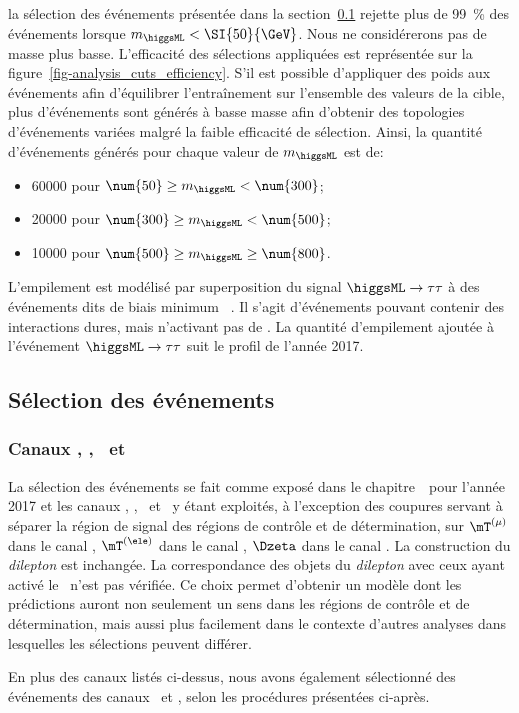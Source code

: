 la sélection des événements présentée dans la section~\ref{chapter-ML-section-evt_gen-selection} rejette plus de \SI{99}{\%} des événements lorsque $m_{\higgsML} < \SI{50}{\GeV}$.
Nous ne considérerons pas de masse plus basse.
L'efficacité des sélections appliquées est représentée sur la figure~\ref{fig-analysis_cuts_efficiency}.
S'il est possible d'appliquer des poids aux événements afin d'équilibrer l'entraînement sur l'ensemble des valeurs de la cible,
plus d'événements sont générés à basse masse afin d'obtenir des topologies d'événements variées malgré la faible efficacité de sélection.
Ainsi, la quantité d'événements générés pour chaque valeur de $m_{\higgsML}$ est de:
\begin{itemize}
\item \num{60000} pour $ \num{50} \geq m_{\higgsML} < \num{300} $;
\item \num{20000} pour $ \num{300} \geq m_{\higgsML} < \num{500} $;
\item \num{10000} pour $ \num{500} \geq m_{\higgsML} \geq \num{800}$.
\end{itemize}
\par
L'empilement est modélisé par superposition du signal $\higgsML\to\tau\tau$ à des événements dits de \og biais minimum \fg~\cite{pythia8.2}.
Il s'agit d'événements pouvant contenir des interactions dures, mais n'activant pas de \HLTpath.
La quantité d'empilement ajoutée à l'événement $\higgsML\to\tau\tau$ suit le profil de l'année 2017.
\subsection{Sélection des événements}\label{chapter-ML-section-evt_gen-selection}
\subsubsection{Canaux \tauh\tauh, \mu\tauh, \ele\tauh\ et \ele\mu}
La sélection des événements se fait comme exposé dans le chapitre~\ pour l'année 2017 et les canaux
\tauh\tauh, \mu\tauh, \ele\tauh\ et \ele\mu\ y étant exploités,
à l'exception des coupures servant à séparer la région de signal des régions de contrôle et de détermination, sur
$\mT^{(\mu)}$ dans le canal \mu\tauh,
$\mT^{(\ele)}$ dans le canal \ele\tauh,
$\Dzeta$ dans le canal \ele\mu.
La construction du \emph{dilepton} est inchangée.
La correspondance des objets du \emph{dilepton} avec ceux ayant activé le \HLTpath\ n'est pas vérifiée.
Ce choix permet d'obtenir un modèle dont les prédictions auront non seulement un sens dans les régions de contrôle et de détermination, mais aussi plus facilement dans le contexte d'autres analyses dans lesquelles les sélections peuvent différer.
\par
En plus des canaux listés ci-dessus, nous avons également sélectionné des événements des canaux \mu\mu\ et \ele\ele,
selon les procédures présentées ci-après.
\renewcommand{\IfMoreOnePair}{Si plus d'une paire possible existe dans l'événement, une seule est retenue selon la logique exposée dans le chapitre~\refChHTT.}
